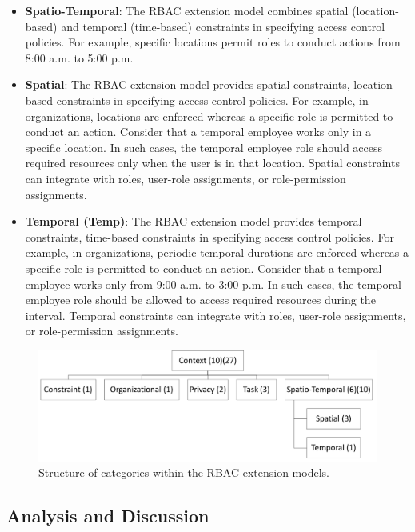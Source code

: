 \begin{itemize}
  \item \textbf{Spatio-Temporal}: The RBAC extension model combines spatial (location-based) and temporal (time-based) constraints in specifying access control policies. For example, specific locations permit roles to conduct actions from 8:00 a.m. to 5:00 p.m.

  \item \textbf{Spatial}: The RBAC extension model provides spatial constraints, location-based constraints in specifying access
	control policies. For example, in organizations, locations are enforced whereas a
	specific role is permitted to conduct an action. Consider that a temporal employee works only in a specific location.
	In such cases, the temporal employee role should access required resources only when the user is in that location. 
	Spatial constraints can integrate with roles, user-role assignments, or role-permission assignments. 

  \item \textbf{Temporal (Temp)}:  The RBAC extension model provides temporal constraints, time-based constraints in specifying access
	control policies. For example, in organizations, periodic temporal durations are enforced whereas a
	specific role is permitted to conduct an action. Consider that a temporal employee works only from 9:00 a.m. to 3:00 p.m.
	In such cases, the temporal employee role should be allowed to access required resources during the interval. 
	Temporal constraints can integrate with roles, user-role assignments, or role-permission assignments.   
	
\end{itemize}

\begin{figure}[ht]
    \centering
        \includegraphics[width=6.0in]{sections/category_structrure.png}
    \caption{\label{fig:category_structrure}Structure of categories within the RBAC extension models.}
\end{figure}

\subsection{Analysis and Discussion}

